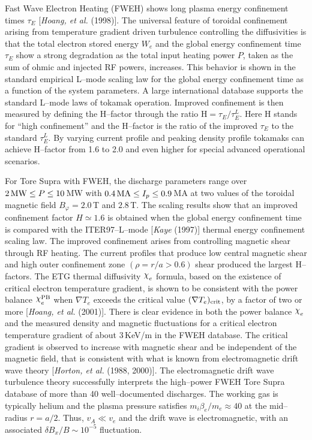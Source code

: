\documentclass[a4paper,openany,12pt]{book}
\def\chix{\raise.5ex\hbox{$\chi$}}
\begin{document}
Fast Wave Electron Heating (FWEH) shows long plasma energy confinement times $\tau_E$ [\emph{Hoang, et al.} (1998)]. The universal feature of toroidal confinement arising from temperature gradient driven turbulence controlling the diffusivities is that the total electron stored energy $W_e$ and the global energy confinement time $\tau_E$ show a strong degradation as the total input heating power $P$, taken as the sum of ohmic and injected RF powers, increases. This behavior is shown in the standard empirical L--mode scaling law for the global energy confinement time as a function of the system parameters. A large international database supports the standard L--mode laws of tokamak operation. Improved confinement is then measured by defining the H--factor through the ratio H$=\tau_E/\tau_E^L$. Here H stands for ``high confinement'' and the H--factor is the ratio of the improved $\tau_E$ to the standard $\tau_E^L$. By varying current profile and peaking density profile tokamaks can achieve H--factor from 1.6 to 2.0 and even higher for special advanced operational scenarios. 

For Tore Supra with FWEH, the discharge parameters range over $2\,{\rm MW}\le P\le 10\,$MW with $0.4\,{\rm MA}\le I_p\le 0.9\,$MA at two values of the toroidal magnetic field $B_\varphi=2.0\,$T and $2.8\,$T. The scaling results show that an improved confinement factor $H\simeq 1.6$ is obtained when the global energy confinement time is compared with the ITER97--L--mode [\emph{Kaye} (1997)] thermal energy confinement scaling law. The improved confinement arises from controlling magnetic shear through RF heating. The current profiles that produce low central magnetic shear and high outer confinement zone $(\rho=r/a>0.6)$ shear produced the largest H--factors. The ETG thermal diffusivity $\chix_e$ formula, based on the existence of critical electron temperature gradient, is shown to be consistent with the power balance $\chix_e^{\rm PB}$ when $\nabla T_e$ exceeds the critical value $(\nabla T_e)_{\rm crit}$, by a factor of two or more [\emph{Hoang, et al.} (2001)]. There is clear evidence in both the power balance $\chix_e$ and the measured density and magnetic fluctuations for a critical electron temperature gradient of about $3\,$KeV/m in the FWEH database. The critical gradient is observed to increase with magnetic shear and be independent of the magnetic field, that is consistent with what is known from electromagnetic drift wave theory [\emph{Horton, et al.} (1988, 2000)]. The electromagnetic drift wave turbulence theory successfully interprets the high--power FWEH Tore Supra database of more than 40 well--documented discharges. The working gas is typically helium and the plasma pressure satisfies $m_i\beta_e/m_e\approx 40$ at the mid--radius $r=a/2$. Thus, $v_A\ll v_e$ and the drift wave is electromagnetic, with an associated $\delta B_x/B\sim 10^{-5}$ fluctuation.
\end{document}
